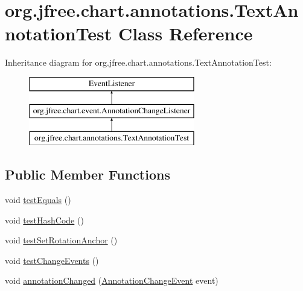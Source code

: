 \hypertarget{classorg_1_1jfree_1_1chart_1_1annotations_1_1_text_annotation_test}{}\section{org.\+jfree.\+chart.\+annotations.\+Text\+Annotation\+Test Class Reference}
\label{classorg_1_1jfree_1_1chart_1_1annotations_1_1_text_annotation_test}
Inheritance diagram for org.\+jfree.\+chart.\+annotations.\+Text\+Annotation\+Test\+:\begin{figure}[H]
\begin{center}
\leavevmode
\includegraphics[height=3.000000cm]{classorg_1_1jfree_1_1chart_1_1annotations_1_1_text_annotation_test}
\end{center}
\end{figure}
\subsection*{Public Member Functions}
\begin{DoxyCompactItemize}
\item 
void \mbox{\hyperlink{classorg_1_1jfree_1_1chart_1_1annotations_1_1_text_annotation_test_abf915b0a3cf48db04ba98cf96844f1ed}{test\+Equals}} ()
\item 
void \mbox{\hyperlink{classorg_1_1jfree_1_1chart_1_1annotations_1_1_text_annotation_test_afee141348882b0f9f8fcfb46b8ff234f}{test\+Hash\+Code}} ()
\item 
void \mbox{\hyperlink{classorg_1_1jfree_1_1chart_1_1annotations_1_1_text_annotation_test_a729e41c7c49bed6929e6e80dc866df97}{test\+Set\+Rotation\+Anchor}} ()
\item 
void \mbox{\hyperlink{classorg_1_1jfree_1_1chart_1_1annotations_1_1_text_annotation_test_a93cd6aee3845fbaf97cc353acce28e6d}{test\+Change\+Events}} ()
\item 
void \mbox{\hyperlink{classorg_1_1jfree_1_1chart_1_1annotations_1_1_text_annotation_test_a2b3df5e757ad94a44c3f61f8264eec28}{annotation\+Changed}} (\mbox{\hyperlink{classorg_1_1jfree_1_1chart_1_1event_1_1_annotation_change_event}{Annotation\+Change\+Event}} event)
\end{DoxyCompactItemize}


